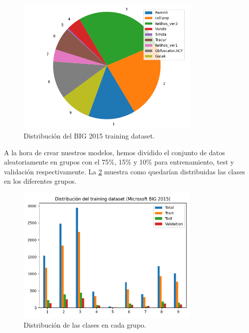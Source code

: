\begin{figure}[h]
    \begin{center}
    \includegraphics[width=0.8\textwidth]{img/circularMMC.png}
    \end{center}
    \caption{Distribución del BIG 2015 training dataset.}
    \label{img: circularMMC}
\end{figure}  

A la hora de crear nuestros modelos, hemos dividido el conjunto de datos aleatoriamente en grupos con el 75\%, 15\% y 10\% para entrenamiento, test y validación respectivamente. La \ref{img: train_test_valMMC} muestra como quedarían distribuidas las clases en los diferentes grupos.

\begin{figure}[h]
    \begin{center}
    \includegraphics[width=0.8\textwidth]{img/barras4MMC.png}
    \end{center}
    \caption{Distribución de las clases en cada grupo.}
    \label{img: train_test_valMMC}
\end{figure}  


